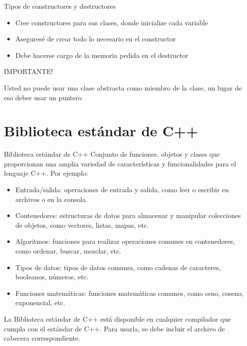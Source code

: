 \documentclass{beamer}
\begin{document}
\begin{frame}{Tipos de constructores y destructores}
\begin{itemize}
    \item Cree constructores para sus clases, donde inicialize cada variable
    \item Aseguresé de crear todo lo necesario en el constructor
    \item Debe hacerse cargo de la memoria pedida en el destructor
\end{itemize}
\begin{center}
    \alert{IMPORTANTE!}

    Usted no puede usar una clase abstracta como miembro de la clase, un lugar de eso deber usar un puntero
\end{center}
\end{frame}

\section{Biblioteca estándar de C++}

\begin{frame}[fragile]{Biblioteca estándar de C++}
Conjunto de funciones, objetos y clases que proporcionan una amplia variedad de características y funcionalidades para el lenguaje C++. Por ejemplo:

\begin{itemize}
\item Entrada/salida: operaciones de entrada y salida, como leer o escribir en archivos o en la consola.
\item Contenedores: estructuras de datos para almacenar y manipular colecciones de objetos, como vectores, listas, mapas, etc.
\item Algoritmos: funciones para realizar operaciones comunes en contenedores, como ordenar, buscar, mezclar, etc.
\item Tipos de datos: tipos de datos comunes, como cadenas de caracteres, booleanos, números, etc.
\item Funciones matemáticas: funciones matemáticas comunes, como seno, coseno, exponencial, etc.
\end{itemize}

La Biblioteca estándar de C++ está disponible en cualquier compilador que cumpla con el estándar de C++. Para usarla, se debe incluir el archivo de cabecera correspondiente.
\end{frame}
\end{document}
